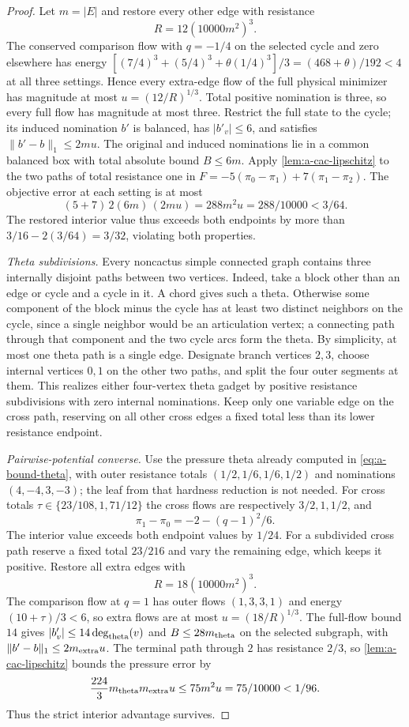 \begin{proof}
Let $m=|E|$ and restore every other edge with resistance
\[
 R=12(10000m^2)^3.
\]
The conserved comparison flow with $q=-1/4$ on the selected cycle and
zero elsewhere has energy
$[(7/4)^3+(5/4)^3+\theta(1/4)^3]/3=(468+\theta)/192<4$
at all three settings. Hence every extra-edge flow of the full physical
minimizer has magnitude at most $u=(12/R)^{1/3}$. Total positive
nomination is three, so every full flow has magnitude at most three.
Restrict the full state to the cycle; its induced nomination $b'$ is
balanced, has $|b'_v|\le6$, and satisfies
$\|b'-b\|_1\le2mu$. The original and induced nominations lie in a common
balanced box with total absolute bound $B\le6m$.
Apply \cref{lem:a-cac-lipschitz} to the two paths of total resistance one
in $F=-5(\pi_0-\pi_1)+7(\pi_1-\pi_2)$. The objective error at each
setting is at most
\[
 (5+7)\,2(6m)\,(2mu)=288m^2u=288/10000<3/64.
\]
The restored interior value thus exceeds both endpoints by more than
$3/16-2(3/64)=3/32$, violating both properties.

\emph{Theta subdivisions.}
Every noncactus simple connected graph contains three internally disjoint
paths between two vertices. Indeed, take a block other than an edge or
cycle and a cycle in it. A chord gives such a theta. Otherwise some
component of the block minus the cycle has at least two distinct
neighbors on the cycle,
since a single neighbor would be an articulation vertex; a connecting
path through that component and the two cycle arcs form the theta. By
simplicity, at most one theta path is a single edge. Designate branch
vertices $2,3$, choose internal vertices $0,1$ on the other two paths,
and split the four outer segments at them. This realizes either
four-vertex theta gadget by positive resistance subdivisions with zero
internal nominations. Keep only one variable edge on the cross path,
reserving on all other cross edges a fixed total less than its lower
resistance endpoint.

\emph{Pairwise-potential converse.}
Use the pressure theta already computed in
\cref{eq:a-bound-theta}, with outer resistance totals
$(1/2,1/6,1/6,1/2)$ and nominations $(4,-4,3,-3)$;
the leaf from that hardness reduction is not needed. For cross totals
$\tau\in\{23/108,1,71/12\}$ the cross flows are respectively
$3/2,1,1/2$, and
\[
 \pi_1-\pi_0=-2-(q-1)^2/6.
\]
The interior value exceeds both endpoint values by $1/24$.
For a subdivided cross path reserve a fixed total $23/216$ and vary the
remaining edge, which keeps it positive. Restore all extra edges with
\[
 R=18(10000m^2)^3.
\]
The comparison flow at $q=1$ has outer flows $(1,3,3,1)$ and energy
$(10+\tau)/3<6$, so extra flows are at most $u=(18/R)^{1/3}$.
The full-flow bound $14$ gives
$|b'_v|\le14\deg_{\rm theta}(v)$ and
$B\le28m_{\rm theta}$ on the selected subgraph, with
$\|b'-b\|_1\le2m_{\rm extra}u$. The terminal path through $2$ has
resistance $2/3$, so \cref{lem:a-cac-lipschitz} bounds the pressure error by
\[
 \frac{224}{3}m_{\rm theta}m_{\rm extra}u
 \le75m^2u=75/10000<1/96.
\]
Thus the strict interior advantage survives.


\end{proof}
